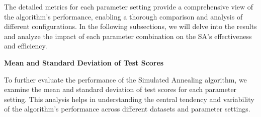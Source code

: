 \documentclass{article}
\begin{document}
    The detailed metrics for each parameter setting provide a comprehensive view of the algorithm's performance, enabling a thorough comparison and analysis of different configurations. In the following subsections, we will delve into the results and analyze the impact of each parameter combination on the SA's effectiveness and efficiency.

    \textbf{Mean and Standard Deviation of Test Scores}

    To further evaluate the performance of the Simulated Annealing algorithm, we examine the mean and standard deviation of test scores for each parameter setting. This analysis helps in understanding the central tendency and variability of the algorithm's performance across different datasets and parameter settings.

    \begin{table}[H]
        \centering
\end{table}
\end{document}
